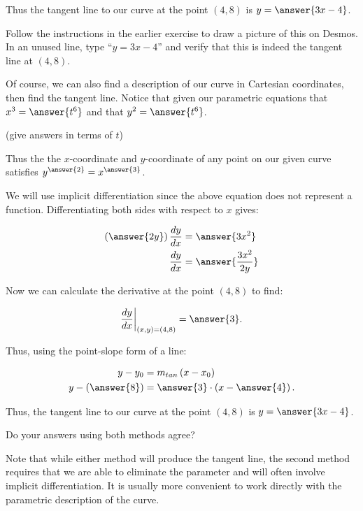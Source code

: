 \documentclass{ximera}
\begin{document}
\begin{exercise}
\begin{exercise}
Thus the tangent line to our curve at the point $(4, 8)$ is $y=\answer{3x-4}$. 

\begin{exercise}
Follow the instructions in the earlier exercise to draw a picture of this on Desmos. In an unused line, type ``$y=3x-4$'' and verify that this is indeed the tangent line at $(4,8)$.
\end{exercise}
\end{exercise}
\begin{exercise}
Of course, we can also find a description of our curve in Cartesian coordinates, then find the tangent line.  Notice that given our parametric equations that $x^3=\answer{t^6}$ and that $y^2=\answer{t^6}$.

(give answers in terms of $t$)

Thus the the $x$-coordinate and $y$-coordinate of any point on our given curve satisfies $y^{\answer{2}}=x^{\answer{3}}$. 

We will use implicit differentiation since the above equation does not represent a function.  Differentiating both sides with respect to $x$ gives:

\begin{align*}
\left(\answer{2y}\right)\dd[y]{x} &= \answer{3x^2} \\
\dd[y]{x} &= \answer{\frac{3x^2}{2y}}
\end{align*}

\begin{exercise}
Now we can calculate the derivative at the point $(4,8)$ to find:

\[
\dd[y]{x}\bigg|_{(x,y)=(4,8)} = \answer{3}.
\]

Thus, using the point-slope form of a line:

\begin{align*}
y-y_0& = m_{tan}\left(x-x_0\right) \\
y-\left(\answer{8}\right)& =\answer{3} \cdot \left(x-\answer{4}\right). \\
\end{align*}

Thus, the tangent line to our curve at the point $(4, 8)$ is $y=\answer{3x-4}$. 

Do your answers using both methods agree?

\begin{multipleChoice}
\end{multipleChoice}

\begin{feedback}[correct]
Note that while either method will produce the tangent line, the second method requires that we are able to eliminate the parameter and will often involve implicit differentiation.  It is usually more convenient to work directly with the parametric description of the curve.
\end{feedback}

\end{exercise}
\end{exercise}


\end{exercise}
\end{document}
